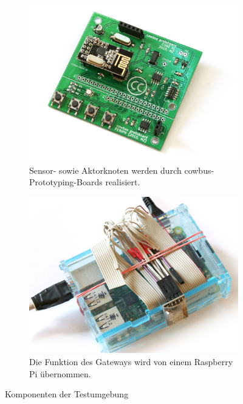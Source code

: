 \documentclass[conference]{IEEEtran}
\begin{document}
    \begin{figure}
        \centering
        \begin{subfigure}{1\columnwidth}
            \includegraphics[width=\columnwidth]{img/img-cowbus-proto}
            \caption{Sensor- sowie Aktorknoten werden durch cowbus-Prototyping-Boards realisiert.}
            \label{subfig:proto}
        \end{subfigure}\hfill
        \begin{subfigure}{1\columnwidth}
            \includegraphics[width=\columnwidth]{img/img-pi-rf}
            \caption{Die Funktion des Gateways wird von einem Raspberry Pi übernommen.}
            \label{subfig:pi}
        \end{subfigure}\hfill
        \caption{Komponenten der Testumgebung}
        \label{fig:comp}
    \end{figure}
\end{document}
